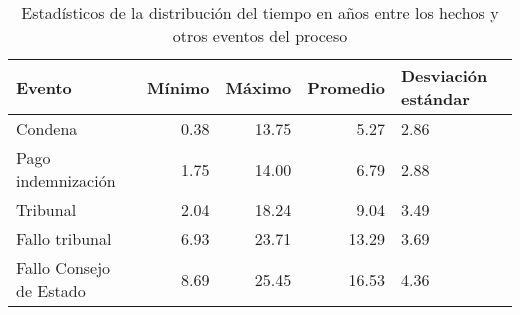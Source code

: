 \begin{table}[h]
\centering
\caption{Estadísticos de la distribución del
tiempo en años entre los hechos y otros eventos del proceso} 
\label{tab:hechos-evento}
\begin{tabular}{lrrrp{2cm}}
  \hline
Evento & Mínimo & Máximo & Promedio & Desviación estándar \\ 
  \hline
Condena & 0.38 & 13.75 & 5.27 & 2.86 \\ 
  Pago indemnización & 1.75 & 14.00 & 6.79 & 2.88 \\ 
  Tribunal & 2.04 & 18.24 & 9.04 & 3.49 \\ 
  Fallo tribunal & 6.93 & 23.71 & 13.29 & 3.69 \\ 
  Fallo Consejo de Estado & 8.69 & 25.45 & 16.53 & 4.36 \\ 
   \hline
\end{tabular}
\end{table}
